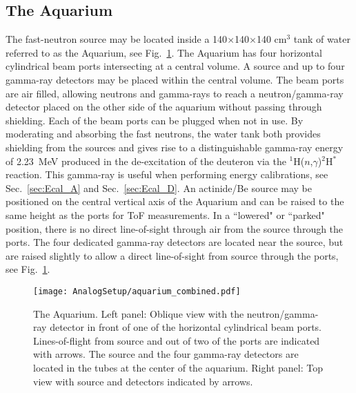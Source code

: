 \documentclass[main.tex]{subfiles}
\begin{document}
\subsection{The Aquarium}
The fast-neutron source may be located inside a 140$\times$140$\times$140 \si{\cm}${}^\text{3}$ tank of water referred to as the Aquarium, see Fig.~\ref{fig:aquarium}. The Aquarium has four horizontal cylindrical beam ports intersecting at a central volume. A source and up to four gamma-ray detectors may be placed within the central volume.  The beam ports are air filled, allowing neutrons and gamma-rays to reach a neutron/gamma-ray detector placed on the other side of the aquarium without passing through shielding. Each of the beam ports can be plugged when not in use.
By moderating and absorbing the fast neutrons, the water tank both provides shielding from the sources and gives rise to a distinguishable gamma-ray energy of \SI{2.23}{MeV} produced in the de-excitation of the deuteron via the $^{\text{1}}$H($n$,$\gamma$)$^{\text{2}}$H$^*$ reaction. This gamma-ray is useful when performing energy calibrations, see Sec.~\ref{sec:Ecal_A} and Sec.~\ref{sec:Ecal_D}. 
An actinide/Be source may be positioned on the central vertical axis of the Aquarium and can be raised to the same height as the ports for ToF measurements. In a ``lowered" or ``parked" position, there is no direct line-of-sight through air from the source through the ports. The four dedicated gamma-ray detectors are located near the source, but are raised slightly to allow a direct line-of-sight from source through the ports, see Fig.~\ref{fig:aquarium}.
\begin{figure}[ht]
	\center
    	\texttt{[image: AnalogSetup/aquarium\_combined.pdf]}
	\caption[The Aquarium.]{The Aquarium. Left panel: Oblique view with the neutron/gamma-ray detector in front of one of the horizontal cylindrical beam ports. Lines-of-flight from source and out of two of the ports are indicated with arrows. The source and the four gamma-ray detectors are located in the tubes at the center of the aquarium. Right panel: Top view with source and detectors indicated by arrows.}
	\label{fig:aquarium}
\end{figure}
\end{document}
